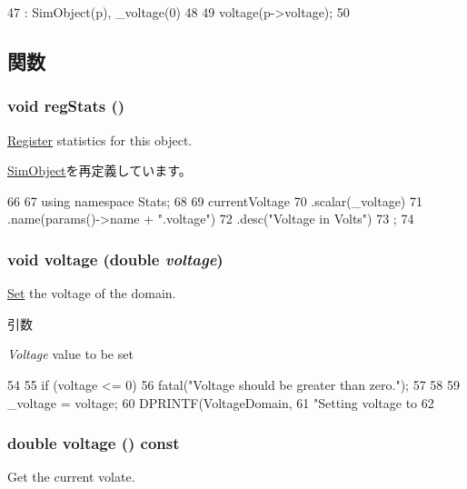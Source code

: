 \begin{DoxyCode}
47     : SimObject(p), _voltage(0)
48 {
49     voltage(p->voltage);
50 }
\end{DoxyCode}


\subsection{関数}
\hypertarget{classVoltageDomain_a4dc637449366fcdfc4e764cdf12d9b11}{
\subsubsection[{regStats}]{\setlength{\rightskip}{0pt plus 5cm}void regStats ()}}
\label{classVoltageDomain_a4dc637449366fcdfc4e764cdf12d9b11}
\hyperlink{classRegister}{Register} statistics for this object. 

\hyperlink{classSimObject_a4dc637449366fcdfc4e764cdf12d9b11}{SimObject}を再定義しています。


\begin{DoxyCode}
66 {
67     using namespace Stats;
68 
69     currentVoltage
70         .scalar(_voltage)
71         .name(params()->name + ".voltage")
72         .desc("Voltage in Volts")
73         ;
74 }
\end{DoxyCode}
\hypertarget{classVoltageDomain_af4a3b41d1fba1c88cd46e85fb5e517c1}{
\subsubsection[{voltage}]{\setlength{\rightskip}{0pt plus 5cm}void voltage (double {\em voltage})}}
\label{classVoltageDomain_af4a3b41d1fba1c88cd46e85fb5e517c1}
\hyperlink{classSet}{Set} the voltage of the domain.


\begin{DoxyParams}{引数}
\item[{\em Voltage}]value to be set \end{DoxyParams}



\begin{DoxyCode}
54 {
55     if (voltage <= 0) {
56         fatal("Voltage should be greater than zero.\n");
57     }
58 
59     _voltage = voltage;
60     DPRINTF(VoltageDomain,
61             "Setting voltage to %
62 }
\end{DoxyCode}
\hypertarget{classVoltageDomain_a3222f13284739dc636f7f10cd265c66f}{
\subsubsection[{voltage}]{\setlength{\rightskip}{0pt plus 5cm}double voltage () const}}
\label{classVoltageDomain_a3222f13284739dc636f7f10cd265c66f}
Get the current volate.

